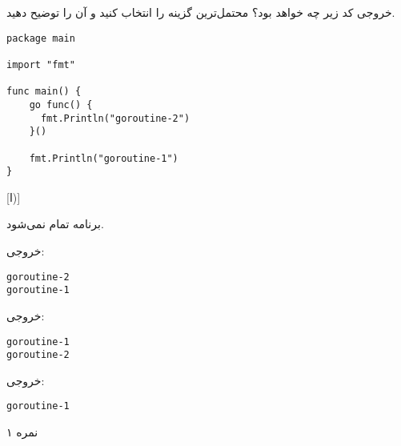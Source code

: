 
خروجی کد زیر چه خواهد بود؟ محتمل‌ترین گزینه را انتخاب کنید و آن را توضیح دهید.

\begin{latin}
\begin{verbatim}
package main

import "fmt"

func main() {
    go func() {
      fmt.Println("goroutine-2")
    }()

    fmt.Println("goroutine-1")
}
\end{verbatim}
\end{latin}

[ا)]

 برنامه تمام نمی‌شود.

 خروجی:

\begin{latin}
\begin{verbatim}
goroutine-2
goroutine-1
\end{verbatim}
\end{latin}

 خروجی:

\begin{latin}
\begin{verbatim}
goroutine-1
goroutine-2
\end{verbatim}
\end{latin}

 خروجی:

\begin{latin}
\begin{verbatim}
goroutine-1
\end{verbatim}
\end{latin}


۱ نمره
